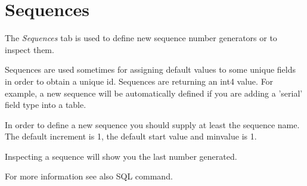 \section{Sequences}
The \emph{Sequences} tab is used to
define new sequence number generators or to inspect them.

Sequences are used sometimes for assigning default values to some unique
fields in order to obtain a unique id. Sequences are returning an int4
value. For example, a new sequence will be automatically defined if you
are adding a 'serial' field type into a table.

In order to define a new sequence you should supply at least the sequence
name. The default increment is 1, the default start value and minvalue is 1.

Inspecting a sequence will show you the last number generated.
  
For more information see also  SQL command.
